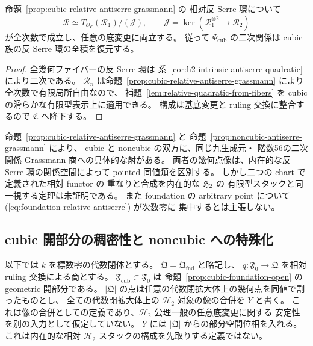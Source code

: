 \begin{corollary}
\label{cor:cubic-relative-full-quadratic-presentation}
命題~\ref{prop:cubic-relative-antiserre-grassmann} の
相対反 Serre 環について
\[
 \mathscr R\simeq
 T_{\mathcal O_{\mathfrak C}}(\mathscr R_1)/(\mathscr J),
 \qquad
 \mathscr J=\ker(\mathscr R_1^{\otimes2}\to\mathscr R_2)
 \tag{C-quad}\label{eq:cubic-relative-full-quadratic}
\]
が全次数で成立し、任意の底変更に両立する。
従って $\Psi_{\mathrm{cub}}$ の二次関係は
cubic 族の反 Serre 環の全積を復元する。
\end{corollary}
\begin{proof}
全幾何ファイバーの反 Serre 環は
系~\ref{cor:h2-intrinsic-antiserre-quadratic} により二次である。
$\mathscr R_n$ は命題~\ref{prop:cubic-relative-antiserre-grassmann} により
全次数で有限局所自由なので、
補題~\ref{lem:relative-quadratic-from-fibers} を
cubic の滑らかな有限型表示上に適用できる。
構成は基底変更と ruling 交換に整合するので
$\mathfrak C$ へ降下する。
\end{proof}

\begin{remark}
命題~\ref{prop:cubic-relative-antiserre-grassmann} と
命題~\ref{prop:noncubic-antiserre-grassmann} により、
cubic と noncubic の双方に、同じ九生成元・
階数56の二次関係 Grassmann 商への具体的な射がある。
両者の幾何点像は、内在的な反 Serre 環の関係空間によって
pointed 同値類を区別する。
しかし二つの chart で定義された相対 functor の
重なりと合成を内在的な $\mathfrak H_2$ の
有限型スタックと同一視する定理は未証明である。
また foundation の arbitrary point について
(\ref{eq:foundation-relative-antiserre}) が次数零に
集中するとは主張しない。
\end{remark}

\subsection{cubic 開部分の稠密性と noncubic への特殊化}
\label{subsec:cubic-noncubic-components}

以下では $k$ を標数零の代数閉体とする。
$\mathfrak Q=\mathfrak Q_{\mathrm{fnd}}$ と略記し、
$q:\mathfrak F_0\to\mathfrak Q$ を相対 ruling 交換による商とする。
$\mathfrak F_{\mathrm{cub}}\subset\mathfrak F_0$ は
命題~\ref{prop:cubic-foundation-open} の geometric 開部分である。
$|\mathfrak Q|$ の点は任意の代数閉拡大体上の幾何点を同値で割ったものとし、
全ての代数閉拡大体上の $\mathcal H_2$ 対象の像の合併を $Y$ と書く。
これは像の合併としての定義であり、$\mathcal H_2$ 公理一般の任意底変更に関する
安定性を別の入力として仮定していない。
$Y$ には $|\mathfrak Q|$ からの部分空間位相を入れる。
これは内在的な相対 $\mathcal H_2$ スタックの構成を先取りする定義ではない。


